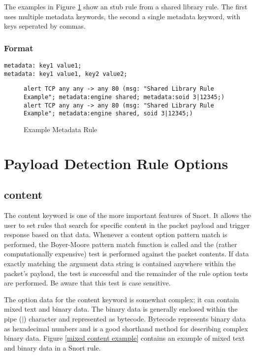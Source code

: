 \documentclass[english]{report}
\begin{document}
The examples in Figure \ref{example metadata rule} show an stub rule from a shared library rule.  The first uses multiple metadata keywords, the second a single metadata keyword, with keys seperated by commas.

\subsubsection{Format}

\begin{verbatim}
metadata: key1 value1;
metadata: key1 value1, key2 value2;
\end{verbatim}

\begin{figure}[!hbpt]
\begin{verbatim}
alert TCP any any -> any 80 (msg: "Shared Library Rule Example"; metadata:engine shared; metadata:soid 3|12345;)
alert TCP any any -> any 80 (msg: "Shared Library Rule Example"; metadata:engine shared, soid 3|12345;)
\end{verbatim}

\caption{Example Metadata Rule\label{example metadata rule}}
\end{figure}

\section{Payload Detection Rule Options}
\subsection{content\label{sub:content}}

The content keyword is one of the more important features of Snort.
It allows the user to set rules that search for specific content in
the packet payload and trigger response based on that data. Whenever
a content option pattern match is performed, the Boyer-Moore pattern
match function is called and the (rather computationally expensive)
test is performed against the packet contents. If data exactly matching
the argument data string is contained anywhere within the packet's
payload, the test is successful and the remainder of the rule option
tests are performed. Be aware that this test is case sensitive.

The option data for the content keyword is somewhat complex; it can
contain mixed text and binary data. The binary data is generally enclosed
within the pipe ($|$) character and represented
as bytecode. Bytecode represents binary data as hexadecimal numbers
and is a good shorthand method for describing complex binary data.
Figure \ref{mixed content example} contains an example of mixed text
and binary data in a Snort rule. 
\end{document}
